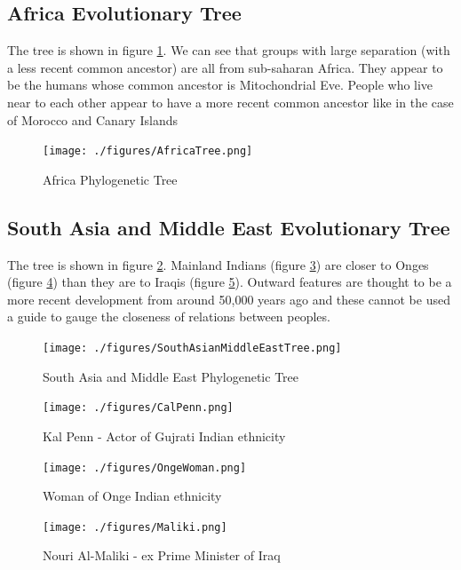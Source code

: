 \documentclass[conference]{IEEEtran}
\begin{document}
\FloatBarrier
\subsection{Africa Evolutionary Tree}

The tree is shown in figure \ref{AfricaTree}. We can see that groups with large separation (with a less recent common ancestor) are all from sub-saharan Africa. They appear to be the humans whose common ancestor is Mitochondrial Eve. People who live near to each other appear to have a more recent common ancestor like in the case of Morocco and Canary Islands

\begin{figure}[!t]
\centering
\texttt{[image: ./figures/AfricaTree.png]}
\caption{Africa Phylogenetic Tree}
\label{AfricaTree}
\end{figure}

\FloatBarrier
\subsection{South Asia and Middle East Evolutionary Tree}

The tree is shown in figure \ref{SouthAsianMiddleEastTree}. Mainland Indians (figure \ref{KalPenn}) are closer to Onges (figure \ref{OngeWoman}) than they are to Iraqis (figure \ref{Maliki}). Outward features are thought to be  a more recent development from around 50,000 years ago \cite{TextBook1} and these cannot be used a guide to gauge the closeness of relations between peoples.

\begin{figure}[!t]
\centering
\texttt{[image: ./figures/SouthAsianMiddleEastTree.png]}
\caption{South Asia and Middle East Phylogenetic Tree}
\label{SouthAsianMiddleEastTree}
\end{figure}

\begin{figure}[!t]
\centering
\texttt{[image: ./figures/CalPenn.png]}
\caption{Kal Penn - Actor of Gujrati Indian ethnicity}
\label{KalPenn}
\end{figure}

\begin{figure}[!t]
\centering
\texttt{[image: ./figures/OngeWoman.png]}
\caption{Woman of Onge Indian ethnicity}
\label{OngeWoman}
\end{figure}

\begin{figure}[!t]
\centering
\texttt{[image: ./figures/Maliki.png]}
\caption{Nouri Al-Maliki - ex Prime Minister of Iraq}
\label{Maliki}
\end{figure}
\end{document}
